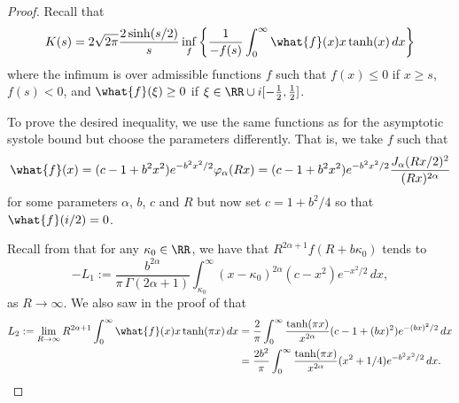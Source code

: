 \documentclass[12pt]{amsart}
\numberwithin{equation}{section}
\begin{document}
\begin{proof}
Recall that
\[
K(s)=  2\sqrt{2\pi}\frac{2\sinh(s/2)}{s} \inf_f\left\{\frac{1}{-f(s)}\int_0^\infty \what{f}(x) x \tanh(x)\,dx \right\}
\]
where the infimum is over admissible functions $f$ such that $f(x)\leq 0$ if $x \geq s$, $f(s)<0$, and $\what{f}(\xi) \geq 0$ if $\xi \in \RR \cup i [-\frac12,\frac12]$.

To prove the desired inequality, we use the same functions as for the asymptotic systole bound but choose the parameters differently. That is, we take $f$ such that
\[
\what{f}(x) = (c-1+b^2 x^2)e^{-b^2x^2/2} \varphi_\alpha(Rx) = (c-1+b^2 x^2)e^{-b^2x^2/2}  \frac{J_\alpha(Rx/2)^2}{(Rx)^{2\alpha}}
\]
for some parameters $\alpha$, $b$, $c$ and $R$ but now set $c = 1+b^2/4$ so that $\what{f}(i/2)=0$.

Recall from  that for any $\kappa_0 \in \RR$, we have that $R^{2\alpha+1}f(R+b\kappa_0)$ tends to
\[
-L_1 :=  \frac{b^{2\alpha}}{\pi\,\Gamma(2\alpha+1)} \int_{\kappa_0}^\infty (x-\kappa_0)^{2\alpha}(c-x^2)e^{-x^2/2}\,dx,
\]
as $R \to \infty$. We also saw in the proof of  that
\begin{align*}
L_2 := \lim_{R\to\infty} R^{2\alpha+1} \int_0^\infty \what{f}(x) x \tanh(\pi x) \,dx &= \frac{2}{\pi}\int_0^\infty \frac{\tanh(\pi x)}{x^{2\alpha}}(c-1+(bx)^2)e^{-(bx)^2/2}\,dx \\
&= \frac{2 b^2}{\pi}\int_0^\infty \frac{\tanh(\pi x)}{x^{2\alpha}}(x^2+1/4)e^{-b^2x^2/2}\,dx.
\end{align*}



\end{proof}
\end{document}
